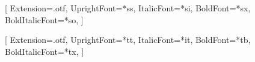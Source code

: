 \documentclass[14pt, russian]{matmex-diploma-custom}
\begin{document}

\maketitle
\setcounter{tocdepth}{2}
\tableofcontents


\pagebreak
\newfontfamily{}[
  Extension=.otf,
  UprightFont=*ss,
  ItalicFont=*si,
  BoldFont=*sx,
  BoldItalicFont=*so,
]











\setmonofont{cmun}[
  Extension=.otf,
  UprightFont=*tt,
  ItalicFont=*it,
  BoldFont=*tb,
  BoldItalicFont=*tx,
]


\end{document}

